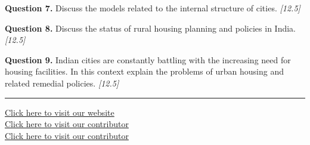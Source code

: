 \documentclass[11pt,a4paper]{article}
\newcommand{\pts}[1]{\hfill   \textit{[#1]}}
\begin{document}
\medskip


\noindent   \textbf{Question 7.} Discuss the models related to the internal structure of cities. \pts{12.5}

\medskip


\noindent   \textbf{Question 8.} Discuss the status of rural housing planning and policies in India. \pts{12.5}

\medskip


\noindent   \textbf{Question 9.} Indian cities are constantly battling with the increasing need for housing facilities. In this context explain the problems of urban housing and related remedial policies. \pts{12.5}

\vfill\rule{\linewidth}{0.4pt}

\begin{center}\small
\href{https://bhu-exam.vercel.app/}{Click here to visit our website}\\[4pt]
\href{https://me-aryan.vercel.app/}{Click here to visit our contributor}\\[4pt]
\href{https://quashan-me.vercel.app/}{Click here to visit our contributor}
\end{center}
\end{document}
